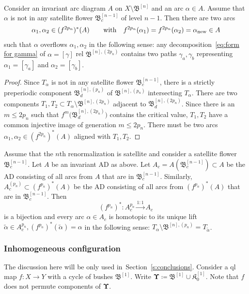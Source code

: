 \documentclass{amsart}
\newcommand{\filled}{{\mathfrak K }}
\newcommand{\bush}{{\mathfrak B }}
\newcommand{\bbush}{{\boldsymbol {\mathfrak B} }}
\newcommand{\bUpsilon}{{\boldsymbol {\Upsilon} }}
\renewcommand{\sp}{{\ \ }}
\newcommand{\1}{{\mathbb 1 }}
\newcommand\new{{\operatorname{new}}}
\begin{document}
\begin{lem}
\label{lem:sss:in out:sat flower}
Consider an invariant arc diagram $A$ on $X\setminus \bbush^{[n]}$ and an arc $\alpha\in A$. Assume that $\alpha$ is not in any satellite flower $\bush^{[n-1]}_c$ of level $n-1$. Then there are two arcs \[\alpha_1,\alpha_2\in (f^{2p_n})^* (A)\hspace{0.6cm} \text{ with }\sp f^{2p_n}(\alpha_1)=f^{2p_n}(\alpha_2)=\alpha_\new \in A\]
such that $\alpha$ overflows $\alpha_1, \alpha_2$ in the following sense: any decomposition~\eqref{eq:form for gamma} of $\alpha=[\gamma]$ rel $\bbush^{[n],(2p_n)}$ contains two paths $\gamma_a, \gamma_b$ representing $\alpha_1=[\gamma_a]$ and $\alpha_2=[\gamma_b]$.
\end{lem}
\begin{proof}
Since $T_\alpha$ is not in any satellite flower $\bush^{[n-1]}_c$, there is a strictly preperiodic component $\bush^{[n],(p_n)}_d$ of $\bbush^{[n],(p_n)}$ intersecting $T_\alpha$. There are two components $T_1,T_2\subset T_\alpha\setminus \bbush^{[n],(2p_n)}$ adjacent to $\bush^{[n],(2p_n)}_d$. Since there is an $m\le 2p_n$ such that
$f^m\big(\bush^{[n],(2p_n)}_d\big)$ contains the critical value, $T_1,T_2$ have a common injective image of generation $m\le 2p_n$. There must be two arcs $\alpha_1,\alpha_2\in  (f^{2p_n})^* (A)$ aligned with $T_1,T_2$. 
\end{proof}


Assume that the $n$th renormalization is satellite and consider a satellite flower $\bush^{[n-1]}_c$. Let $A$ be an invariant AD as above. Let $A_c=A(\bush^{[n-1]}_c)\subset A$ be the AD consisting of all arcs from $A$ that are in $\bush^{[n-1]}_c$. Similarly, $A^{(p_n)}_c\subset (f^{p_n})^*(A)$ be the AD consisting of all arcs from $ (f^{p_n})^*(A)$ that are in $\bush^{[n-1]}_c$. Then 
\begin{equation}
\label{eq:invarirance:A_c}
(f^{p_n})^*\colon A_c^{p_n}\overset{1:1}{\longrightarrow}  A_c
\end{equation}
is a bijection and every arc $\alpha\in A_c$ is homotopic to its unique lift $\tilde \alpha\in A_c^{p_n}, (f^{p_n})^*(\tilde \alpha)=\alpha$ in the following sense: $T_{\alpha}\setminus \bbush^{[n],(p_n)}=T_{\tilde \alpha}$.
\subsubsection{Inhomogeneous configuration} \label{sss:mixed conf} The discussion here will be only used in~Section~\ref{s:conclusions}. Consider a ql map $f\colon X\to Y$ with a cycle of bushes $\bbush^{[1]}$. Write $\bUpsilon\coloneqq \bbush^{[1]}\cup \filled^{[1]}_0$. Note that $f$ does not permute components of $\bUpsilon$.
\end{document}
